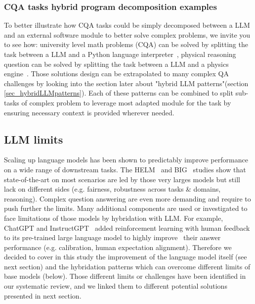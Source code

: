 \documentclass[acmsmall]{acmart}
\begin{document}
\subsubsection{\textbf{CQA tasks hybrid program decomposition examples}}
To better illustrate how CQA tasks could be simply decomposed between a LLM and an external software module to better solve complex problems, we invite you to see how: university level math problems (CQA) can be solved by splitting the task between a LLM and a Python language interpreter~\citep{droriNeuralNetworkSolves2022}, physical reasoning question can be solved by splitting the task between a LLM and a physics engine~\citep{liuMindEyeGrounded2022}.
Those solutions design can be extrapolated to many complex QA challenges by looking into the section later about "hybrid LLM patterns"(section \ref{sec_hybridLLMpatterns}). Each of these patterns can be combined to split sub-tasks of complex problem to leverage most adapted module for the task by ensuring necessary context is provided wherever needed.

\subsection{LLM limits}\label{sec_LLMlimits}
Scaling up language models has been shown to predictably improve performance\citep{weiEmergentAbilitiesLarge2022} on a wide range of downstream tasks. The HELM~\citep{liangetal.HolisticEvaluationLanguage2022} and BIG~\citep{bigetal.ImitationGameQuantifying2022} studies show that state-of-the-art on most scenarios are led by those very larges models but still lack on different sides (e.g. fairness, robustness across tasks \& domains, reasoning). Complex question answering are even more demanding and require to push further the limits. Many additional components are used or investigated to face limitations of those models by hybridation with LLM. For example, ChatGPT and InstructGPT~\citep{baiTrainingHelpfulHarmless2022} added reinforcement learning with human feedback to its pre-trained large language model to highly improve~\citep{mahowaldDissociatingLanguageThought2023} their answer performance (e.g. calibration, human expectation alignment). Therefore we decided to cover in this study the improvement of the language model itself (see next section) and the hybridation patterns which can overcome different limits of base models (below).
Those different limits or challenges have been identified in our systematic review, and we linked them to different potential solutions presented in next section.
\end{document}
